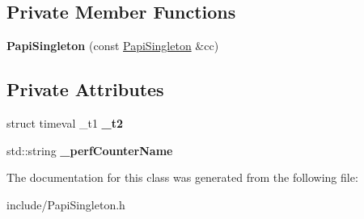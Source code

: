 \subsection*{Private Member Functions}
\begin{DoxyCompactItemize}
\item 
\hypertarget{classPapiSingleton_a82706d8ae9cf1766d8220fdd4a4261de}{{\bfseries Papi\-Singleton} (const \hyperlink{classPapiSingleton}{Papi\-Singleton} \&cc)}\label{classPapiSingleton_a82706d8ae9cf1766d8220fdd4a4261de}

\end{DoxyCompactItemize}
\subsection*{Private Attributes}
\begin{DoxyCompactItemize}
\item 
\hypertarget{classPapiSingleton_a3ffd3b8be11f9d59956f1e4f45c80a88}{struct timeval \-\_\-t1 {\bfseries \-\_\-t2}}\label{classPapiSingleton_a3ffd3b8be11f9d59956f1e4f45c80a88}

\item 
\hypertarget{classPapiSingleton_ade3ce5bcc8aaa8b9f52d31f63b176577}{std\-::string {\bfseries \-\_\-perf\-Counter\-Name}}\label{classPapiSingleton_ade3ce5bcc8aaa8b9f52d31f63b176577}

\end{DoxyCompactItemize}


The documentation for this class was generated from the following file\-:\begin{DoxyCompactItemize}
\item 
include/Papi\-Singleton.\-h\end{DoxyCompactItemize}

